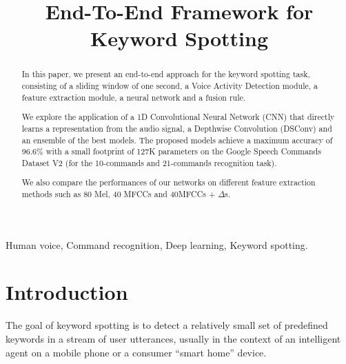 \documentclass[conference]{IEEEtran}
\begin{document}
\title{End-To-End Framework for Keyword Spotting}
\author{
\and
{}
}

\maketitle

\begin{abstract}
In this paper, we present an end-to-end approach for the keyword spotting task, consisting of a sliding window of one second, a Voice Activity Detection module, a feature extraction module, a neural network and a fusion rule.

We explore the application of a 1D Convolutional Neural Network (CNN) that directly learns a representation from the audio signal, a Depthwise Convolution (DSConv) and an ensemble of the best models.
The proposed models achieve a maximum accuracy of 96.6\% with a small footprint of 127K parameters on the Google Speech Commands Dataset V2 (for the 10-commands and 21-commands recognition task).

We also compare the performances of our networks on different feature extraction methods such as 80 Mel, 40 MFCCs and 40MFCCs + $\Delta$s.
\end{abstract}

\IEEEpeerreviewmaketitle
\begin{IEEEkeywords}
Human voice, Command recognition, Deep learning, Keyword spotting.
\end{IEEEkeywords}

\section{Introduction}
The goal of keyword spotting is to detect a relatively small set of predefined keywords in a stream of user utterances, usually in the context of an intelligent agent on a mobile phone or a consumer “smart home” device.
\end{document}
